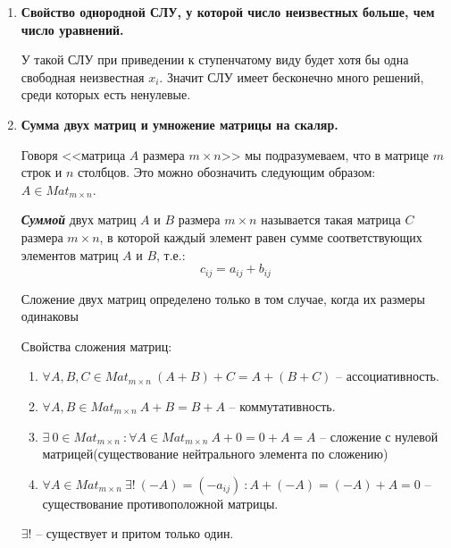 \begin{enumerate}
\item \textbf{Свойство однородной СЛУ, у которой число неизвестных больше, чем число уравнений.} 

	У такой СЛУ при приведении к ступенчатому виду будет хотя бы одна свободная неизвестная $x_i$. Значит СЛУ имеет бесконечно много решений, среди которых есть ненулевые. 
	
\item \textbf{Сумма двух матриц и умножение матрицы на скаляр.} 
\begin{Comment}
	Говоря <<матрица $A$ размера $m \times n$>>  мы подразумеваем, что в матрице $m$ строк и $n$ столбцов. Это можно обозначить следующим образом: $A \in Mat_{m \times n}$.
\end{Comment}

	\textit{\textbf{Суммой}} двух матриц $A$ и $B$ размера $m \times n$ называется такая матрица $C$ размера $m \times n$, в которой каждый элемент равен сумме соответствующих элементов матриц $A$ и $B$, т.е.:
	\[
		c_{ij} = a_{ij} + b_{ij}
	\]
	\begin{Comment}
		Сложение двух матриц определено только в том случае, когда их размеры одинаковы
	\end{Comment}
	Свойства сложения матриц:
	\begin{enumerate}
		\item $\forall A, B, C \in Mat_{m\times n}\ (A + B) + C = A + (B + C)$ -- ассоциативность.
		\item $\forall A, B \in Mat_{m\times n}\ A + B= B + A$ -- коммутативность.
		\item $\exists\ 0 \in Mat_{m\times n}\ : \forall A \in Mat_{m\times n}\ A + 0= 0 + A = A$ -- сложение с нулевой матрицей(существование нейтрального элемента по сложению)
		\item $\forall A \in Mat_{m\times n}\ \exists !\ (-A) = (-a_{ij})\ :  A + (-A)= (-A) + A = 0$ -- существование противоположной матрицы.
	\end{enumerate}
	$\exists!$ -- существует и притом только один.\\\\
	

\end{enumerate}
